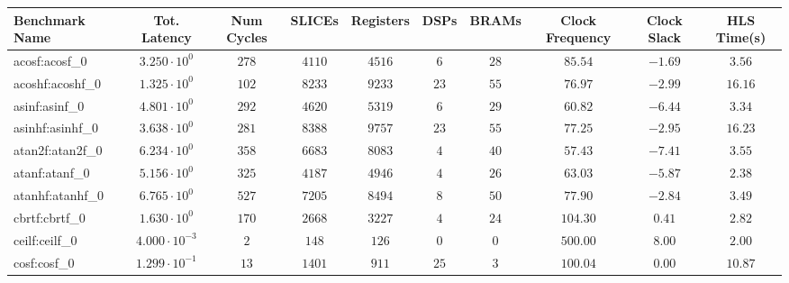\begin{tabular}{|l|c|c|c|c|c|c|c|c|c|}
\hline
Benchmark Name               & Tot. Latency            & Num Cycles & SLICEs     & Registers  & DSPs    & BRAMs   & Clock Frequency & Clock Slack & HLS Time(s) \\
\hline
acosf:acosf\_0               & $ 3.250 \cdot 10^{0}  $ & $ 278    $ & $ 4110   $ & $ 4516   $ & $ 6   $ & $ 28  $ & $ 85.54       $ & $ -1.69   $ & $ 3.56    $ \\
acoshf:acoshf\_0             & $ 1.325 \cdot 10^{0}  $ & $ 102    $ & $ 8233   $ & $ 9233   $ & $ 23  $ & $ 55  $ & $ 76.97       $ & $ -2.99   $ & $ 16.16   $ \\
asinf:asinf\_0               & $ 4.801 \cdot 10^{0}  $ & $ 292    $ & $ 4620   $ & $ 5319   $ & $ 6   $ & $ 29  $ & $ 60.82       $ & $ -6.44   $ & $ 3.34    $ \\
asinhf:asinhf\_0             & $ 3.638 \cdot 10^{0}  $ & $ 281    $ & $ 8388   $ & $ 9757   $ & $ 23  $ & $ 55  $ & $ 77.25       $ & $ -2.95   $ & $ 16.23   $ \\
atan2f:atan2f\_0             & $ 6.234 \cdot 10^{0}  $ & $ 358    $ & $ 6683   $ & $ 8083   $ & $ 4   $ & $ 40  $ & $ 57.43       $ & $ -7.41   $ & $ 3.55    $ \\
atanf:atanf\_0               & $ 5.156 \cdot 10^{0}  $ & $ 325    $ & $ 4187   $ & $ 4946   $ & $ 4   $ & $ 26  $ & $ 63.03       $ & $ -5.87   $ & $ 2.38    $ \\
atanhf:atanhf\_0             & $ 6.765 \cdot 10^{0}  $ & $ 527    $ & $ 7205   $ & $ 8494   $ & $ 8   $ & $ 50  $ & $ 77.90       $ & $ -2.84   $ & $ 3.49    $ \\
cbrtf:cbrtf\_0               & $ 1.630 \cdot 10^{0}  $ & $ 170    $ & $ 2668   $ & $ 3227   $ & $ 4   $ & $ 24  $ & $ 104.30      $ & $ 0.41    $ & $ 2.82    $ \\
ceilf:ceilf\_0               & $ 4.000 \cdot 10^{-3} $ & $ 2      $ & $ 148    $ & $ 126    $ & $ 0   $ & $ 0   $ & $ 500.00      $ & $ 8.00    $ & $ 2.00    $ \\
cosf:cosf\_0                 & $ 1.299 \cdot 10^{-1} $ & $ 13     $ & $ 1401   $ & $ 911    $ & $ 25  $ & $ 3   $ & $ 100.04      $ & $ 0.00    $ & $ 10.87   $ \\

\end{tabular}
